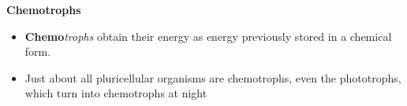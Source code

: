 \documentclass[]{book}
\providecommand{\tightlist}{%
  \setlength{\itemsep}{0pt}\setlength{\parskip}{0pt}}
\theoremstyle{definition}
\theoremstyle{definition}
\theoremstyle{definition}
\theoremstyle{remark}
\begin{document}
\textbf{Chemotrophs}

\begin{itemize}
\tightlist
\item
  \textbf{Chemo}\emph{trophs} obtain their energy as energy previously
  stored in a chemical form.
\item
  Just about all pluricellular organisms are chemotrophs, even the
  phototrophs, which turn into chemotrophs at night 
\end{itemize}


\end{document}
